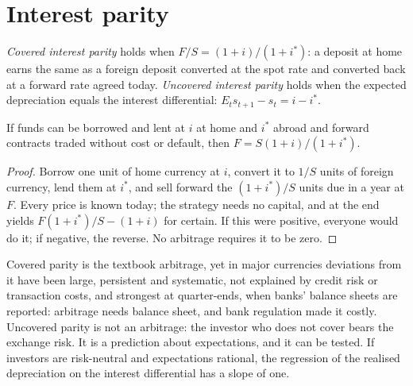 \section{Interest parity}\label{sec:b3:exchange-rates:interest-parity}

\begin{definition}\label{def:b3:exchange-rates:interest-parity}
\emph{Covered interest parity} holds when $F/S = (1 + i)/(1 + i^*)$: a deposit at home earns
the same as a foreign deposit converted at the spot rate and converted back at a
forward rate agreed today. \emph{Uncovered interest parity} holds when the expected
depreciation equals the interest differential: $E_t s_{t+1} - s_t = i - i^*$.
\end{definition}

\begin{proposition}\label{prop:b3:exchange-rates:cip}
If funds can be borrowed and lent at $i$ at home and $i^*$ abroad and forward
contracts traded without cost or default, then $F = S(1 + i)/(1 + i^*)$.
\end{proposition}

\begin{proof}
Borrow one unit of home currency at $i$, convert it to $1/S$ units of foreign
currency, lend them at $i^*$, and sell forward the $(1 + i^*)/S$ units due in a year at
$F$. Every price is known today; the strategy needs no capital, and at the end
yields $F(1 + i^*)/S - (1 + i)$ for certain. If this were positive, everyone would do it;
if negative, the reverse. No arbitrage requires it to be zero.
\end{proof}

Covered parity is the textbook arbitrage, yet in major currencies deviations from
it have been large, persistent and systematic, not explained by credit risk or
transaction costs, and strongest at quarter-ends, when banks' balance sheets are
reported: arbitrage needs balance sheet, and bank regulation made it costly.
Uncovered parity is not an arbitrage: the investor who does not cover bears the
exchange risk. It is a prediction about expectations, and it can be tested. If
investors are risk-neutral and expectations rational, the regression of the
realised depreciation on the interest differential has a slope of one.

